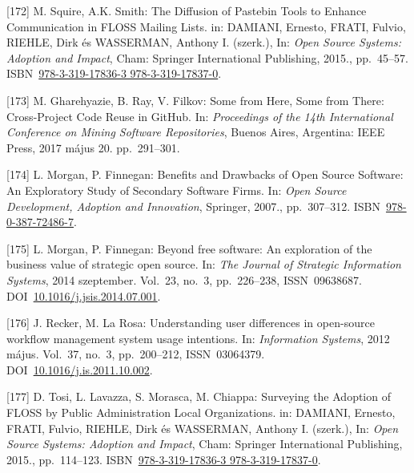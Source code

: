 \documentclass[12pt,magyar,a4paper,oneside]{scrreprt}
\newenvironment{cslreferences}%
  {}%
  {\par}
\begin{document}
\begin{cslreferences}
\leavevmode\hypertarget{ref-damiani_diffusion_2015}{}%
{[}172{]} M. Squire, A.K. Smith: The Diffusion of Pastebin Tools to
Enhance Communication in FLOSS Mailing Lists. in: DAMIANI, Ernesto,
FRATI, Fulvio, RIEHLE, Dirk és WASSERMAN, Anthony I. (szerk.), In:
\emph{Open Source Systems: Adoption and Impact}, Cham: Springer
International Publishing, 2015., pp.~45--57.
ISBN~\href{https://worldcat.org/isbn/978-3-319-17836-3\%20978-3-319-17837-0}{978-3-319-17836-3 978-3-319-17837-0}.

\leavevmode\hypertarget{ref-gharehyazie_here_2017}{}%
{[}173{]} M. Gharehyazie, B. Ray, V. Filkov: Some from Here, Some from
There: Cross-Project Code Reuse in GitHub. In: \emph{Proceedings of the
14th International Conference on Mining Software Repositories}, Buenos
Aires, Argentina: IEEE Press, 2017 május 20. pp.~291--301.

\leavevmode\hypertarget{ref-morgan_benefits_2007}{}%
{[}174{]} L. Morgan, P. Finnegan: Benefits and Drawbacks of Open Source
Software: An Exploratory Study of Secondary Software Firms. In:
\emph{Open Source Development, Adoption and Innovation}, Springer,
2007., pp.~307--312.
ISBN~\href{https://worldcat.org/isbn/978-0-387-72486-7}{978-0-387-72486-7}.

\leavevmode\hypertarget{ref-morgan_beyond_2014}{}%
{[}175{]} L. Morgan, P. Finnegan: Beyond free software: An exploration
of the business value of strategic open source. In: \emph{The Journal of
Strategic Information Systems}, 2014 szeptember. Vol.~23, no.~3,
pp.~226--238, ISSN~09638687.
DOI~\href{https://doi.org/10.1016/j.jsis.2014.07.001}{10.1016/j.jsis.2014.07.001}.

\leavevmode\hypertarget{ref-recker_understanding_2012}{}%
{[}176{]} J. Recker, M. La Rosa: Understanding user differences in
open-source workflow management system usage intentions. In:
\emph{Information Systems}, 2012 május. Vol.~37, no.~3, pp.~200--212,
ISSN~03064379.
DOI~\href{https://doi.org/10.1016/j.is.2011.10.002}{10.1016/j.is.2011.10.002}.

\leavevmode\hypertarget{ref-damiani_surveying_2015}{}%
{[}177{]} D. Tosi, L. Lavazza, S. Morasca, M. Chiappa: Surveying the
Adoption of FLOSS by Public Administration Local Organizations. in:
DAMIANI, Ernesto, FRATI, Fulvio, RIEHLE, Dirk és WASSERMAN, Anthony I.
(szerk.), In: \emph{Open Source Systems: Adoption and Impact}, Cham:
Springer International Publishing, 2015., pp.~114--123.
ISBN~\href{https://worldcat.org/isbn/978-3-319-17836-3\%20978-3-319-17837-0}{978-3-319-17836-3 978-3-319-17837-0}.


\end{cslreferences}
\end{document}
